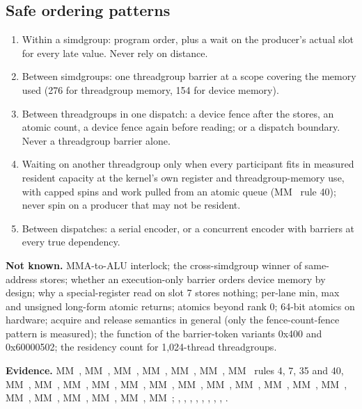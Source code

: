 \subsection*{Safe ordering patterns}

\begin{enumerate}
\def\labelenumi{\arabic{enumi}.}
\item Within a simdgroup: program order, plus a wait on the producer's actual slot for every late value. Never rely on
  distance.
\item Between simdgroups: one threadgroup barrier at a scope covering the memory used (276 for threadgroup memory, 154 for
  device memory).
\item Between threadgroups in one dispatch: a device fence after the stores, an atomic count, a device fence again before
  reading; or a dispatch boundary. Never a threadgroup barrier alone.
\item Waiting on another threadgroup only when every participant fits in measured resident capacity at the kernel's own
  register and threadgroup-memory use, with capped spins and work pulled from an atomic queue (MM~ rule 40); never spin
  on a producer that may not be resident.
\item Between dispatches: a serial encoder, or a concurrent encoder with barriers at every true dependency.
\end{enumerate}

\textbf{Not known.} MMA-to-ALU interlock; the cross-simdgroup winner of same-address stores; whether an execution-only
barrier orders device memory by design; why a special-register read on slot 7 stores nothing; per-lane min, max and
unsigned long-form atomic returns; atomics beyond rank 0; 64-bit atomics on hardware; acquire and release semantics in
general (only the fence-count-fence pattern is measured); the function of the barrier-token variants 0x400 and 0x60000502;
the residency count for 1,024-thread threadgroups.

\textbf{Evidence.} MM~, MM~, MM~, MM~, MM~, MM~, MM~ rules 4, 7, 35 and 40, MM~, MM~, MM~,
MM~, MM~, MM~, MM~, MM~, MM~, MM~, MM~, MM~, MM~,
MM~, MM~, MM~, MM~, MM~; , ,
, , ,
, , ,
.
